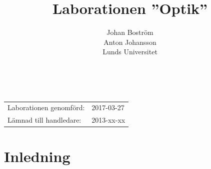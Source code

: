\documentclass[a4paper]{article}
\title{Laborationen ”Optik”}
\author{Johan Boström\\Anton Johansson\\Lunds Universitet}
\makeatletter
\renewcommand*\maketitle{
  {
    \begin{center}
      {\huge\bfseries \@title}\\
      \vspace{5mm}
      {\large \@author}
    \end{center}
    \vspace{2mm}
  }
}
\makeatother
\begin{document}
\maketitle


\begin{abstract}
\end{abstract}

\vspace{2mm}

\hspace{-3mm}
\begin{tabular}{ll}
Laborationen genomförd: &	2017-03-27 \\
Lämnad till handledare: &	2013-xx-xx \\
\end{tabular}

\vspace{3mm}

\section{Inledning}

%
\end{document}
